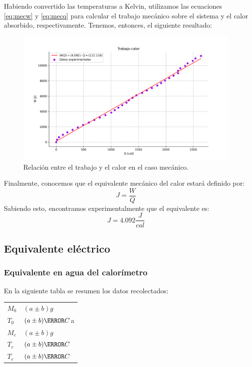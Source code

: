 \documentclass{article}
\begin{document}
Habiendo convertido las temperaturas a Kelvin, utilizamos las ecuaciones \ref{eq:mecw} y \ref{eq:mecq} para calcular el trabajo mecánico sobre el sistema y el calor absorbido, respectivamente. Tenemos, entonces, el siguiente resultado:
\begin{figure}
    \centering
    \includegraphics[scale=0.5]{mecworkheat.png}
    \caption{Relación entre el trabajo y el calor en el caso mecánico.}
    \label{fig:mecworkheat}
\end{figure}
Finalmente, conocemos que el equivalente mecánico del calor estará definido por:
\begin{equation}
    J = \frac{W}{Q}
    \label{eqivmec}
\end{equation}
Sabiendo esto, encontramos experimentalmente que el equivalente es:
\begin{equation*}
    J = 4.092 \frac{J}{cal}
\end{equation*}

\subsection{Equivalente eléctrico}
\subsubsection{Equivalente en agua del calorímetro}
En la siguiente tabla se resumen los datos recolectados:

\begin{table}[H]
\centering
\begin{tabular}{l|l}
$M_0$ & $(a \pm b)g$\\
$T_0$ & $(a \pm b) \degree C$a\\
$M_c$ & $(a \pm b)g$\\
$T_c$ & $(a \pm b) \degree C$\\
$T_e$ & $(a \pm b) \degree C$
\end{tabular}
\end{table}
\end{document}
